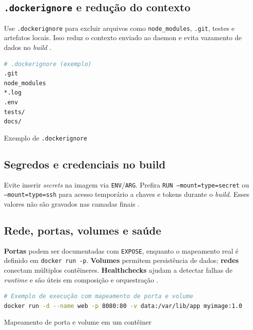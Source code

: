 \subsection{\texttt{.dockerignore} e redução do contexto}
\label{subsec:dockerignore}

Use \texttt{.dockerignore} para excluir arquivos como \texttt{node\_modules}, \texttt{.git}, testes e artefatos locais. Isso reduz o contexto enviado ao daemon e evita vazamento de dados no \textit{build} \cite{dockerfile_ref}. 

\begin{codigo}[H]
\begin{lstlisting}[language=bash]
# .dockerignore (exemplo)
.git
node_modules
*.log
.env
tests/
docs/
\end{lstlisting}
\caption{Exemplo de \texttt{.dockerignore}}
\label{lst:dockerignore}
\end{codigo}

\subsection{Segredos e credenciais no build}
\label{subsec:secrets}

Evite inserir \textit{secrets} na imagem via \texttt{ENV}/\texttt{ARG}. Prefira \texttt{RUN --mount=type=secret} ou \texttt{--mount=type=ssh} para acesso temporário a chaves e tokens durante o \textit{build}. Esses valores não são gravados nas camadas finais \cite{dockerfile_ref}. 

\subsection{Rede, portas, volumes e saúde}
\label{sec:network-storage}

\textbf{Portas} podem ser documentadas com \texttt{EXPOSE}, enquanto o mapeamento real é definido em \texttt{docker run -p}. \textbf{Volumes} permitem persistência de dados; \textbf{redes} conectam múltiplos contêineres. \textbf{Healthchecks} ajudam a detectar falhas de \textit{runtime} e são úteis em composição e orquestração \cite{dockerfile_ref,docker_overview}.

\begin{codigo}[H]
\begin{lstlisting}[language=bash]
# Exemplo de execução com mapeamento de porta e volume
docker run -d --name web -p 8080:80 -v data:/var/lib/app myimage:1.0
\end{lstlisting}
\caption{Mapeamento de porta e volume em um contêiner}
\label{lst:docker-run-ports-vol}
\end{codigo}

